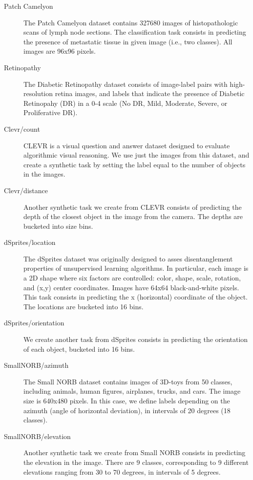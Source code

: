 \documentclass{article}
\begin{document}
\begin{description}
    \item[Patch Camelyon] \citep{veeling2018rotation} The Patch Camelyon dataset contains \num{327680} images of histopathologic scans of lymph node sections. The classification task consists in predicting the  presence of metastatic tissue in given image (i.e., two classes). All images are 96x96 pixels. 
    \item[Retinopathy] \citep{kaggle-diabetic-retinopathy} The Diabetic Retinopathy dataset consists of image-label pairs with high-resolution retina images, and labels that indicate the presence of Diabetic Retinopahy (DR) in a 0-4 scale (No DR, Mild, Moderate, Severe, or Proliferative DR).
    \item[Clevr/count] \citep{johnson2017clevr} CLEVR is a visual question and answer dataset designed to evaluate algorithmic visual reasoning. We use just the images from this dataset, and create a synthetic task by setting the label equal to the number of objects in the images.
    \item[Clevr/distance] \citep{johnson2017clevr} Another synthetic task we create from CLEVR consists of predicting the depth of the closest object in the image from the camera. The depths are bucketed into size bins.
    \item[dSprites/location] \citep{dsprites17} The dSprites dataset was originally designed to asses disentanglement properties of unsupervised learning algorithms. In particular, each image is a 2D shape where six factors are controlled: color, shape, scale, rotation, and (x,y) center coordinates. Images have 64x64 black-and-white pixels.
    This task consists in predicting the x (horizontal) coordinate of the object.
    The locations are bucketed into 16 bins.
    \item[dSprites/orientation] \citep{dsprites17} We create another task from dSprites consists in predicting the orientation of each object, bucketed into 16 bins.
    \item[SmallNORB/azimuth] \citep{lecun2004learning} The Small NORB dataset contains images of 3D-toys from 50 classes, including animals, human figures, airplanes, trucks, and cars. The image size is 640x480 pixels. In this case, we define labels depending on the azimuth 	(angle of horizontal deviation), in intervals of 20 degrees (18 classes).
    \item[SmallNORB/elevation] \citep{lecun2004learning} Another synthetic task we create from Small NORB consists in predicting the elevation in the image. There are 9 classes, corresponding to 9 different elevations ranging from 30 to 70 degrees, in intervals of 5 degrees.

\end{description}
\end{document}
